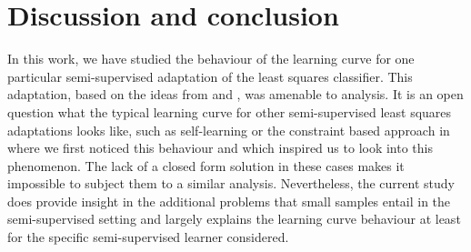 \documentclass[runningheads,a4paper]{llncs}\usepackage[]{graphicx}\usepackage[]{color}
\begin{document}
\section{Discussion and conclusion}
In this work, we have studied the behaviour of the learning curve for one particular semi-supervised adaptation of the least squares classifier. This adaptation, based on the ideas from \cite{Shaffer1991} and \cite{Fan2008}, was amenable to analysis. It is an open question what the typical learning curve for other semi-supervised least squares adaptations looks like, such as self-learning or the constraint based approach in \cite{Krijthe2015} where we first noticed this behaviour and which inspired us to look into this phenomenon. The lack of a closed form solution in these cases makes it impossible to subject them to a similar analysis.  Nevertheless, the current study does provide insight in the additional problems that small samples entail in the semi-supervised setting and largely explains the learning curve behaviour at least for the specific semi-supervised learner considered.




\end{document}
